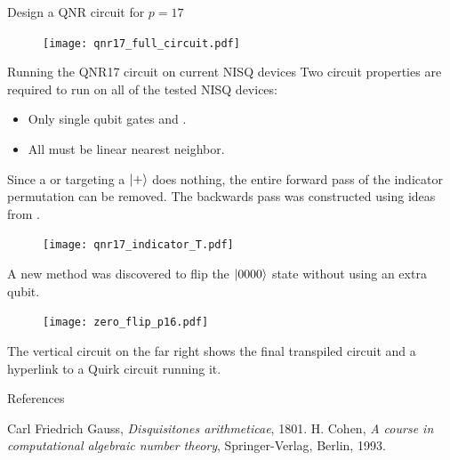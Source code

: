 \documentclass[final]{beamer}
\newlength{\colwidth}
\begin{document}
\begin{frame}[t]
\begin{columns}[t]
\begin{column}{\colwidth}
\begin{block}{Design a QNR circuit for $p=17$}

  \begin{center}
    \begin{figure}
      \texttt{[image: qnr17\_full\_circuit.pdf]}
    \end{figure}
  \end{center}

  \end{block}

  \begin{block}{Running the QNR17 circuit on current NISQ devices}
    Two circuit properties are required to run on all of the tested NISQ devices:
    \begin{itemize}
      \item Only single qubit gates and \CNOTs.
      \item All \CNOTs must be linear nearest neighbor.
    \end{itemize}

    Since a \CNOT or \CCNOT targeting a $\left| + \right\rangle$ does nothing, the entire forward pass of the indicator permutation can be removed.
    The backwards pass was constructed using ideas from \cite{3957}. 
    \begin{figure}
      \texttt{[image: qnr17\_indicator\_T.pdf]}
    \end{figure}

    A new method was discovered to flip the $\left| 0000 \right\rangle$ state without using an extra qubit.%

    \begin{figure}
      \texttt{[image: zero\_flip\_p16.pdf]}
    \end{figure}
  The vertical circuit on the far right shows the final transpiled circuit and a hyperlink to a Quirk circuit running it.
  \end{block}


  \begin{block}{References}
    {\fontsize{15pt}{15pt}\selectfont
\begin{thebibliography}{100} %
   Carl Friedrich Gauss, \emph{Disquisitones arithmeticae}, 1801.
   H. Cohen, \emph{A course in computational algebraic number theory}, Springer-Verlag, Berlin, 1993.


\end{thebibliography}}
\end{block}
\end{column}
\end{columns}
\end{frame}
\end{document}
